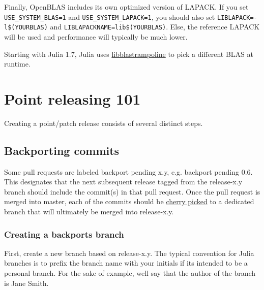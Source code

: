 Finally, OpenBLAS includes its own optimized version of LAPACK. If you set \texttt{USE\_SYSTEM\_BLAS=1} and \texttt{USE\_SYSTEM\_LAPACK=1}, you should also set \texttt{LIBLAPACK=-l\$(YOURBLAS)} and \texttt{LIBLAPACKNAME=lib\$(YOURBLAS)}. Else, the reference LAPACK will be used and performance will typically be much lower.



Starting with Julia 1.7, Julia uses \href{https://github.com/JuliaLinearAlgebra/libblastrampoline}{libblastrampoline} to pick a different BLAS at runtime.



\hypertarget{13254364787517196998}{}


\section{Point releasing 101}



Creating a point/patch release consists of several distinct steps.



\hypertarget{12357762204955987571}{}


\subsection{Backporting commits}



Some pull requests are labeled {\textquotedbl}backport pending x.y{\textquotedbl}, e.g. {\textquotedbl}backport pending 0.6{\textquotedbl}. This designates that the next subsequent release tagged from the release-x.y branch should include the commit(s) in that pull request. Once the pull request is merged into master, each of the commits should be \href{https://git-scm.com/docs/git-cherry-pick}{cherry picked} to a dedicated branch that will ultimately be merged into release-x.y.



\hypertarget{4966159163932283918}{}


\subsubsection{Creating a backports branch}



First, create a new branch based on release-x.y. The typical convention for Julia branches is to prefix the branch name with your initials if it{\textquotesingle}s intended to be a personal branch. For the sake of example, we{\textquotesingle}ll say that the author of the branch is Jane Smith.




